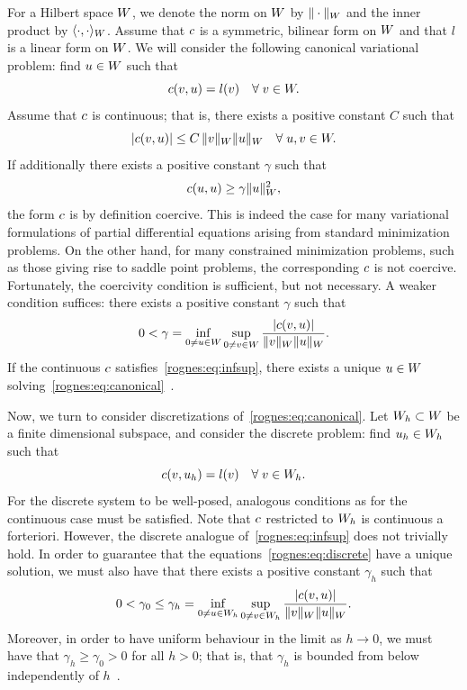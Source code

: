 For a Hilbert space $W$, we denote the norm on $W$ by
$\|\cdot\|_{W}$ and the inner product by $\langle \cdot, \cdot
\rangle_{W}$. Assume that $c$ is a symmetric, bilinear form on
$W$ and that $l$ is a linear form on $W$. We will consider the
following canonical variational problem: find $u \in W$ such that
\begin{equation}
  \label{rognes:eq:canonical}
  c(v, u) = l(v) \quad \forall \; v \in W.
\end{equation}
Assume that $c$ is continuous; that is, there exists a positive
constant $C$ such that
\begin{equation*}
  |c(v, u)| \leq C \, \|v\|_{W} \|u\|_{W} \quad \forall \; u, v \in W.
\end{equation*}
If additionally there exists a positive constant $\gamma$ such that
\begin{equation*}
  c(u, u) \geq \gamma \|u\|_{W}^2,
\end{equation*}
the form $c$ is by definition coercive. This is indeed the case for
many variational formulations of partial differential equations
arising from standard minimization problems. On the other hand, for
many constrained minimization problems, such as those giving rise to
saddle point problems, the corresponding $c$ is not coercive.
Fortunately, the coercivity condition is sufficient, but not
necessary. A weaker condition suffices: there exists a positive
constant $\gamma$ such that
\begin{equation}
  \label{rognes:eq:infsup}
  0 < \gamma = \inf_{0 \not = u \in W} \sup_{0 \not = v \in W} \frac{|c(v,
    u)|}{\|v\|_{W}\|u\|_{W}}.
\end{equation}
If the continuous $c$ satisfies~\eqref{rognes:eq:infsup}, there exists a
unique $u \in W$
solving~\eqref{rognes:eq:canonical}~\cite{Babuska1973}.

Now, we turn to consider discretizations of~\eqref{rognes:eq:canonical}. Let
$W_h \subset W$ be a finite dimensional subspace, and consider the
discrete problem: find $u_h \in W_h$ such that
\begin{equation}
  \label{rognes:eq:discrete}
  c(v, u_h) = l(v) \quad \forall \; v \in W_h.
\end{equation}
For the discrete system to be well-posed, analogous conditions as for
the continuous case must be satisfied. Note that $c$ restricted to
$W_h$ is continuous a forteriori. However, the discrete analogue
of~\eqref{rognes:eq:infsup} does not trivially hold. In order to
guarantee that the equations~\eqref{rognes:eq:discrete} have a
unique solution, we must also have that there exists a positive
constant $\gamma_h$ such that
\begin{equation}
  \label{rognes:eq:infsup:discrete}
  0 < \gamma_0 \leq \gamma_h = \inf_{0 \not = u \in W_h} \sup_{0
    \not = v \in W_h} \frac{|c(v, u)|}{\|v\|_{W}\|u\|_{W}}.
\end{equation}
Moreover, in order to have uniform behaviour in the limit as $h
\rightarrow 0$, we must have that $\gamma_h \geq \gamma_0 > 0$ for all
$h > 0$; that is, that $\gamma_h$ is bounded from below independently
of $h$~\cite{Babuska1973}.


